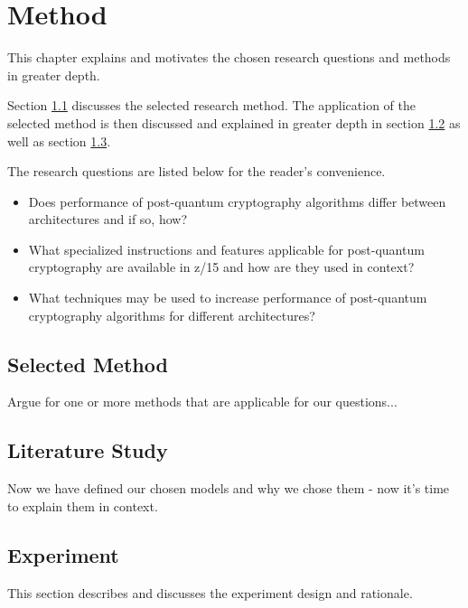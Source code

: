 \chapter{Method}
\label{chapter:method}

This chapter explains and motivates the chosen research questions and methods in greater depth.

Section \ref{section:method:selected-method} discusses the selected research method. The application of the selected method is then discussed and explained in greater depth in section \ref{section:method:literature-study} as well as section \ref{section:method:experiment}.

The research questions are listed below for the reader's convenience.

\begin{itemize}
    \item Does performance of post-quantum cryptography algorithms differ between architectures and if so, how?
    \item What specialized instructions and features applicable for post-quantum cryptography are available in z/15 and how are they used in context?
    \item What techniques may be used to increase performance of post-quantum cryptography algorithms for different architectures?
\end{itemize}

\section{Selected Method}
\label{section:method:selected-method}

Argue for one or more methods that are applicable for our questions...

\section{Literature Study}
\label{section:method:literature-study}

Now we have defined our chosen models and why we chose them - now it's time to explain them in context.

\section{Experiment}
\label{section:method:experiment}

This section describes and discusses the experiment design and rationale.

